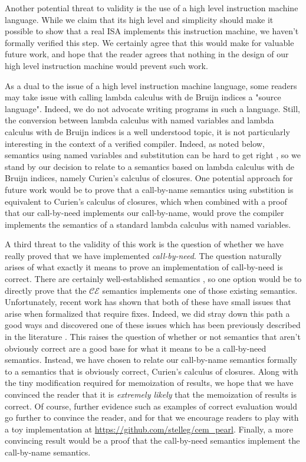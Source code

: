 Another potential threat to validity is the use of a high level instruction
machine language. While we claim that its high level and simplicity should make
it possible to show that a real ISA implements this instruction machine, we
haven't formally verified this step. We certainly agree that this would make for
valuable future work, and hope that the reader agrees that nothing in the design
of our high level instruction machine would prevent such work.

As a dual to the issue of a high level instruction machine language, some
readers may take issue with calling lambda calculus with de Bruijn indices a
"source language". Indeed, we do not advocate writing programs in such a
language. Still, the conversion between lambda calculus with named variables and
lambda calculus with de Bruijn indices is a well understood topic, it is not
particularly interesting in the context of a verified compiler.  Indeed, as
noted below, semantics using named variables and substitution can be
hard to get right \cite{breitnerthesis, nakata2009small}, so we stand by our
decision to relate to a semantics based on lambda calculus with de Bruijn
indices, namely Curien's calculus of closures. One potential approach for future
work would be to prove that a call-by-name semantics using substition is
equivalent to Curien's calculus of closures, which when combined with a proof
that our call-by-need implements our call-by-name, would prove the compiler
implements the semantics of a standard lambda calculus with named variables.

A third threat to the validity of this work is the question of whether 
we have really proved that we have implemented \emph{call-by-need}. The question
naturally arises of what exactly it means to prove an implementation of
call-by-need is correct. There are certainly well-established semantics
\cite{launchburynatural, ariola1995call}, so one option would be to directly
prove that the $\mathcal{CE}$ semantics implements one of those existing
semantics.  Unfortunately, recent work has shown that both of these have small
issues that arise when formalized that require fixes. Indeed, we did stray down
this path a good ways and discovered one of these issues which has been
previously described in the literature \cite{nakata2009small}. This raises the
question of whether or not semantics that aren't obviously correct are a good
base for what it means to be a call-by-need semantics. Instead, we have chosen to
relate our call-by-name semantics formally to a semantics that is obviously
correct, Curien's calculus of closures. Along with the tiny modification
required for memoization of results, we hope that we have convinced the reader
that it is \emph{extremely likely} that the memoization of results is correct.
Of course, further evidence such as examples of correct evaluation would go
further to convince the reader, and for that we encourage readers to
play with a toy implementation at \url{https://github.com/stelleg/cem\_pearl}.
Finally, a more convincing result would be a proof that the call-by-need
semantics implement the call-by-name semantics. 

